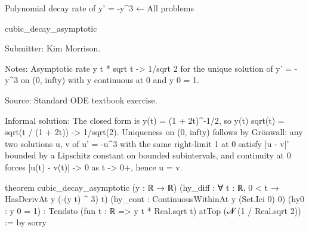 Polynomial decay rate of y' = -y^3
← All problems

cubic_decay_asymptotic

Submitter: Kim Morrison.

Notes: Asymptotic rate y t * sqrt t -> 1/sqrt 2 for the unique solution of y' = -y^3 on (0, infty) with y continuous at 0 and y 0 = 1.

Source: Standard ODE textbook exercise.

Informal solution: The closed form is y(t) = (1 + 2t)^{-1/2}, so y(t) sqrt(t) = sqrt(t / (1 + 2t)) -> 1/sqrt(2). Uniqueness on (0, infty) follows by Grönwall: any two solutions u, v of u' = -u^3 with the same right-limit 1 at 0 satisfy |u - v|' bounded by a Lipschitz constant on bounded subintervals, and continuity at 0 forces |u(t) - v(t)| -> 0 as t -> 0+, hence u = v.

theorem cubic_decay_asymptotic (y : ℝ → ℝ) (hy_diff : ∀ t : ℝ, 0 < t → HasDerivAt y (-(y t) ^ 3) t)
    (hy_cont : ContinuousWithinAt y (Set.Ici 0) 0)
    (hy0 : y 0 = 1) :
    Tendsto (fun t : ℝ => y t * Real.sqrt t) atTop (𝓝 (1 / Real.sqrt 2)) := by
  sorry